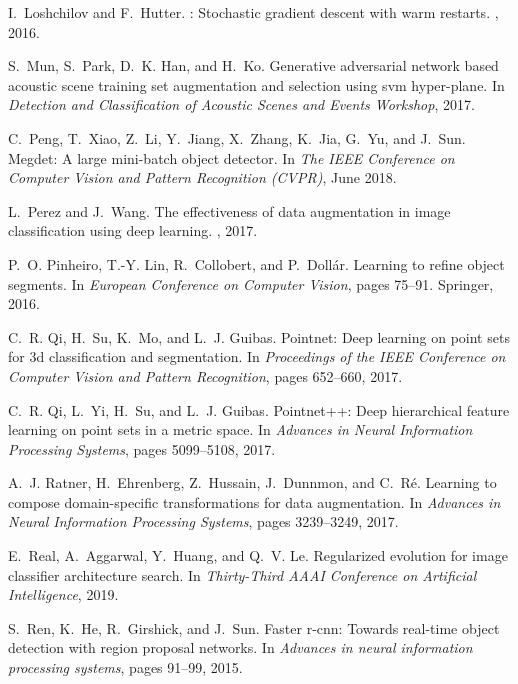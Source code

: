 \documentclass[10pt,twocolumn,letterpaper]{article}
\begin{document}
\begin{thebibliography}{10}
I.~Loshchilov and F.~Hutter.
: Stochastic gradient descent with warm restarts.
, 2016.

S.~Mun, S.~Park, D.~K. Han, and H.~Ko.
\newblock Generative adversarial network based acoustic scene training set
  augmentation and selection using svm hyper-plane.
\newblock In {\em Detection and Classification of Acoustic Scenes and Events
  Workshop}, 2017.

C.~Peng, T.~Xiao, Z.~Li, Y.~Jiang, X.~Zhang, K.~Jia, G.~Yu, and J.~Sun.
\newblock Megdet: A large mini-batch object detector.
\newblock In {\em The IEEE Conference on Computer Vision and Pattern
  Recognition (CVPR)}, June 2018.

L.~Perez and J.~Wang.
\newblock The effectiveness of data augmentation in image classification using
  deep learning.
, 2017.

P.~O. Pinheiro, T.-Y. Lin, R.~Collobert, and P.~Doll{\'a}r.
\newblock Learning to refine object segments.
\newblock In {\em European Conference on Computer Vision}, pages 75--91.
  Springer, 2016.

C.~R. Qi, H.~Su, K.~Mo, and L.~J. Guibas.
\newblock Pointnet: Deep learning on point sets for 3d classification and
  segmentation.
\newblock In {\em Proceedings of the IEEE Conference on Computer Vision and
  Pattern Recognition}, pages 652--660, 2017.

C.~R. Qi, L.~Yi, H.~Su, and L.~J. Guibas.
\newblock Pointnet++: Deep hierarchical feature learning on point sets in a
  metric space.
\newblock In {\em Advances in Neural Information Processing Systems}, pages
  5099--5108, 2017.

A.~J. Ratner, H.~Ehrenberg, Z.~Hussain, J.~Dunnmon, and C.~R{\'e}.
\newblock Learning to compose domain-specific transformations for data
  augmentation.
\newblock In {\em Advances in Neural Information Processing Systems}, pages
  3239--3249, 2017.

E.~Real, A.~Aggarwal, Y.~Huang, and Q.~V. Le.
\newblock Regularized evolution for image classifier architecture search.
\newblock In {\em Thirty-Third AAAI Conference on Artificial Intelligence},
  2019.

S.~Ren, K.~He, R.~Girshick, and J.~Sun.
\newblock Faster r-cnn: Towards real-time object detection with region proposal
  networks.
\newblock In {\em Advances in neural information processing systems}, pages
  91--99, 2015.


\end{thebibliography}
\end{document}

